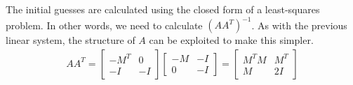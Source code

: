 \documentclass{article}
\begin{document}
The initial guesses are calculated using the closed form of a least-squares problem. In other words, we need to calculate $(AA^T)^{-1}$. As with the previous linear system, the structure of $A$ can be exploited to make this simpler.
\begin{align}
		AA^T = \begin{bmatrix}
				-M^T & 0\\
				-I & -I
		\end{bmatrix}
		\begin{bmatrix}
				-M & -I\\
				0 & -I
				\end{bmatrix}
				= \begin{bmatrix}
								M^TM & M^T\\
								M & 2I
				\end{bmatrix}
\end{align}
\end{document}
